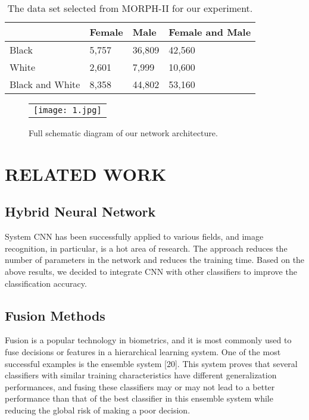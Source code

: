 \documentclass[12pt]{spieman}
\begin{document}
\begin{spacing}{2}
\begin{table}[ht]
\caption{The data set selected from MORPH-II for our experiment.} 
\label{tab:fonts}
\begin{center}       
\begin{tabular}{|l|l|l|l|} %
\hline
\rule[-1ex]{0pt}{3.5ex}   & Female & Male & Female and Male\\
\hline\hline
\rule[-1ex]{0pt}{3.5ex} Black & 5,757 & 36,809 & 42,560  \\
\hline
\rule[-1ex]{0pt}{3.5ex}  White & 2,601 & 7,999 & 10,600   \\
\hline
\rule[-1ex]{0pt}{3.5ex} Black and White & 8,358 & 44,802 & 53,160  \\
\hline
\end{tabular}
\end{center}
\end{table} 

\begin{figure}
\begin{center}
\begin{tabular}{c}
\texttt{[image: 1.jpg]}
\end{tabular}
\end{center}
\caption 
{ \label{fig:example1}
Full schematic diagram of our network architecture. } 
\end{figure} 


\section{RELATED WORK}

\subsection{Hybrid Neural Network }
\label{sect:title}
System CNN has been successfully applied to various fields, and image recognition, in particular, is a hot area of research. The approach reduces the number of parameters in the network and reduces the training time. Based on the above results, we decided to integrate CNN with other classifiers to improve the classification accuracy. 

\subsection{Fusion Methods}
Fusion is a popular technology in biometrics, and it is most commonly used to fuse decisions or features in a hierarchical learning system. One of the most successful examples is the ensemble system [20]. This system proves that several classifiers with similar training characteristics have different generalization performances, and fusing these classifiers may or may not lead to a better performance than that of the best classifier in this ensemble system while reducing the global risk of making a poor decision. 


\end{spacing}
\end{document}
